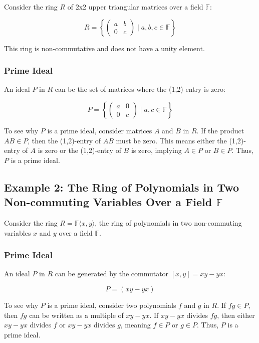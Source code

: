 Consider the ring \( R \) of 2x2 upper triangular matrices over a field \( \mathbb{F} \):

\[
R = \left\{ \begin{pmatrix}
	a & b \\
	0 & c
\end{pmatrix} \mid a, b, c \in \mathbb{F} \right\}
\]

This ring is non-commutative and does not have a unity element.

\subsubsection*{Prime Ideal}

An ideal \( P \) in \( R \) can be the set of matrices where the (1,2)-entry is zero:

\[
P = \left\{ \begin{pmatrix}
	a & 0 \\
	0 & c
\end{pmatrix} \mid a, c \in \mathbb{F} \right\}
\]

To see why \( P \) is a prime ideal, consider matrices \( A \) and \( B \) in \( R \). If the product \( AB \in P \), then the (1,2)-entry of \( AB \) must be zero. This means either the (1,2)-entry of \( A \) is zero or the (1,2)-entry of \( B \) is zero, implying \( A \in P \) or \( B \in P \). Thus, \( P \) is a prime ideal.

\subsection*{Example 2: The Ring of Polynomials in Two Non-commuting Variables Over a Field \( \mathbb{F} \)}

Consider the ring \( R = \mathbb{F}\langle x, y \rangle \), the ring of polynomials in two non-commuting variables \( x \) and \( y \) over a field \( \mathbb{F} \).

\subsubsection*{Prime Ideal}

An ideal \( P \) in \( R \) can be generated by the commutator \( [x, y] = xy - yx \):

\[
P = (xy - yx)
\]

To see why \( P \) is a prime ideal, consider two polynomials \( f \) and \( g \) in \( R \). If \( fg \in P \), then \( fg \) can be written as a multiple of \( xy - yx \). If \( xy - yx \) divides \( fg \), then either \( xy - yx \) divides \( f \) or \( xy - yx \) divides \( g \), meaning \( f \in P \) or \( g \in P \). Thus, \( P \) is a prime ideal.


